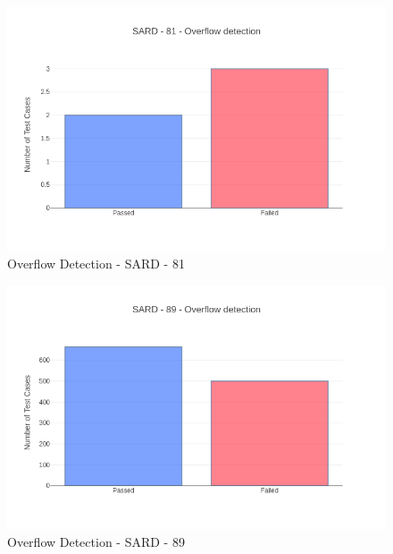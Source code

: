\begin{figure}
\begin{centering}
\includegraphics[width=140mm]{images/sard81.png}
\caption{Overflow Detection - SARD - 81\label{fig:fig41}}
\par\end{centering}
\end{figure}

\begin{figure}
\begin{centering}
\includegraphics[width=140mm]{images/sard89.png}
\caption{Overflow Detection - SARD - 89\label{fig:fig42}}
\par\end{centering}
\end{figure}

